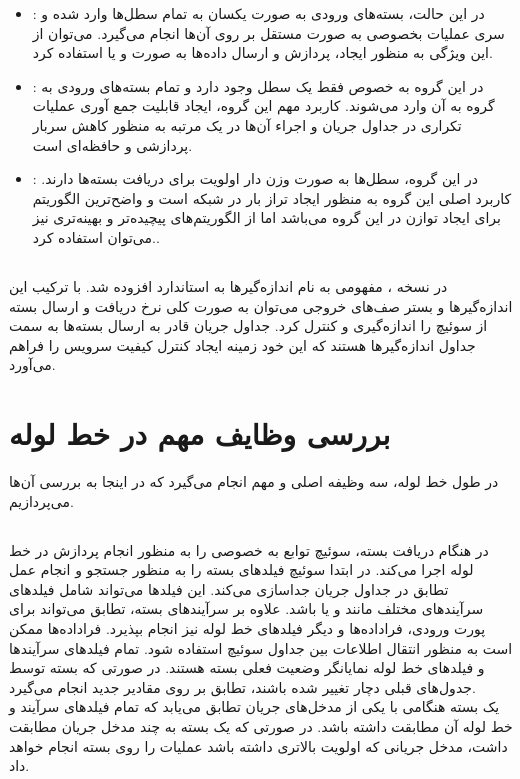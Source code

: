 \begin{itemize}
	\item {}:
در این حالت، بسته‌های ورودی به صورت یکسان به تمام سطل‌ها وارد شده و سری عملیات بخصوصی به صورت مستقل بر روی آن‌ها انجام می‌گیرد. می‌توان از این ویژگی به منظور ایجاد، پردازش و ارسال داده‌ها به صورت  و یا  استفاده کرد.
	\item {}:
در این گروه به خصوص فقط یک سطل وجود دارد و تمام بسته‌های ورودی به گروه به آن وارد می‌شوند. کاربرد مهم این گروه، ایجاد قابلیت جمع آوری عملیات تکراری در جداول جریان و اجراء آن‌ها در یک مرتبه به منظور کاهش سربار پردازشی و حافظه‌ای است.
	\item {}:
در این گروه، سطل‌ها به صورت وزن دار اولویت برای دریافت بسته‌ها دارند. کاربرد اصلی این گروه به منظور ایجاد تراز بار در شبکه است و واضح‌ترین الگوریتم برای ایجاد توازن در این گروه  می‌باشد اما از الگوریتم‌های پیچیده‌تر و بهینه‌تری نیز می‌توان استفاده کرد..
\end{itemize}

\subsection{}
در نسخه ، مفهومی به نام اندازه‌گیر‌ها به استاندارد  افزوده شد. با ترکیب این اندازه‌گیر‌ها و بستر صف‌های خروجی می‌توان به صورت کلی نرخ دریافت و ارسال بسته از سوئیچ را اندازه‌گیری و کنترل کرد. جداول جریان قادر به ارسال بسته‌ها به سمت جداول اندازه‌گیر‌ها هستند که این خود زمینه ایجاد کنترل کیفیت سرویس را فراهم می‌آورد.

\section{بررسی وظایف مهم در خط لوله}
در طول خط لوله، سه وظیفه اصلی و مهم انجام می‌گیرد که در اینجا به بررسی آن‌ها می‌پردازیم.

\subsection{}
در هنگام دریافت بسته، سوئیچ توابع به خصوصی را به منظور انجام پردازش در خط لوله اجرا می‌کند. در ابتدا سوئیچ فیلد‌های بسته را به منظور جستجو و انجام عمل تطابق در جداول جریان جداسازی می‌کند. این فیلد‌ها می‌تواند شامل فیلد‌های سرآیند‌های مختلف مانند  و یا  باشد. علاوه بر سرآیند‌های بسته، تطابق می‌تواند برای پورت ورودی، فراداده‌ها و دیگر فیلد‌های خط لوله نیز انجام بپذیرد. فراداده‌ها ممکن است به منظور انتقال اطلاعات بین جداول سوئیچ استفاده شود. تمام فیلد‌های سرآیند‌ها و فیلد‌های خط لوله نمایانگر وضعیت فعلی بسته هستند. در صورتی که بسته توسط جدول‌های قبلی دچار تغییر شده باشند، تطابق بر روی مقادیر جدید انجام می‌گیرد.\\
یک بسته هنگامی با یکی از مدخل‌های جریان تطابق می‌یابد که تمام فیلد‌های سرآیند و خط لوله آن مطابقت داشته باشد. در صورتی که یک بسته به چند مدخل جریان مطابقت داشت، مدخل جریانی که اولویت بالاتری داشته باشد عملیات را روی بسته انجام خواهد داد.

